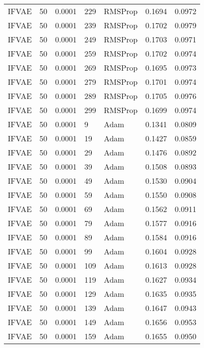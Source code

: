 \begin{tabular}{llrllrr}
 IFVAE &   50 &  0.0001 &   229 &   RMSProp &  0.1694 &       0.0972 \\
 IFVAE &   50 &  0.0001 &   239 &   RMSProp &  0.1702 &       0.0979 \\
 IFVAE &   50 &  0.0001 &   249 &   RMSProp &  0.1703 &       0.0971 \\
 IFVAE &   50 &  0.0001 &   259 &   RMSProp &  0.1702 &       0.0974 \\
 IFVAE &   50 &  0.0001 &   269 &   RMSProp &  0.1695 &       0.0973 \\
 IFVAE &   50 &  0.0001 &   279 &   RMSProp &  0.1701 &       0.0974 \\
 IFVAE &   50 &  0.0001 &   289 &   RMSProp &  0.1705 &       0.0976 \\
 IFVAE &   50 &  0.0001 &   299 &   RMSProp &  0.1699 &       0.0974 \\
 IFVAE &   50 &  0.0001 &     9 &      Adam &  0.1341 &       0.0809 \\
 IFVAE &   50 &  0.0001 &    19 &      Adam &  0.1427 &       0.0859 \\
 IFVAE &   50 &  0.0001 &    29 &      Adam &  0.1476 &       0.0892 \\
 IFVAE &   50 &  0.0001 &    39 &      Adam &  0.1508 &       0.0893 \\
 IFVAE &   50 &  0.0001 &    49 &      Adam &  0.1530 &       0.0904 \\
 IFVAE &   50 &  0.0001 &    59 &      Adam &  0.1550 &       0.0908 \\
 IFVAE &   50 &  0.0001 &    69 &      Adam &  0.1562 &       0.0911 \\
 IFVAE &   50 &  0.0001 &    79 &      Adam &  0.1577 &       0.0916 \\
 IFVAE &   50 &  0.0001 &    89 &      Adam &  0.1584 &       0.0916 \\
 IFVAE &   50 &  0.0001 &    99 &      Adam &  0.1604 &       0.0928 \\
 IFVAE &   50 &  0.0001 &   109 &      Adam &  0.1613 &       0.0928 \\
 IFVAE &   50 &  0.0001 &   119 &      Adam &  0.1627 &       0.0934 \\
 IFVAE &   50 &  0.0001 &   129 &      Adam &  0.1635 &       0.0935 \\
 IFVAE &   50 &  0.0001 &   139 &      Adam &  0.1647 &       0.0943 \\
 IFVAE &   50 &  0.0001 &   149 &      Adam &  0.1656 &       0.0953 \\
 IFVAE &   50 &  0.0001 &   159 &      Adam &  0.1655 &       0.0950 \\

\end{tabular}
